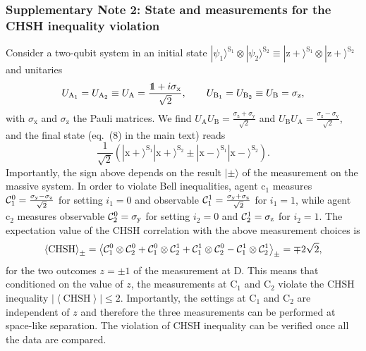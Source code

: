 \documentclass[a4paper,11pt]{article}
\newcommand\id{\leavevmode\hbox{\small1\kern-3.3pt\normalsize1}}
\newcommand{\ket}{\rangle}
\begin{document}
\subsubsection*{Supplementary Note 2: State and measurements for the CHSH inequality violation}

Consider a two-qubit system in an initial state $|\psi_1\ket^\mathrm{S_1}\otimes|\psi_2\ket^\mathrm{S_2}\equiv |\mathrm{z+}\ket^\mathrm{S_1}\otimes|\mathrm{z+}\ket^\mathrm{S_2}$ and unitaries %
\begin{equation}
\label{unitaries} U_\mathrm{A_1}=U_\mathrm{A_2}\equiv U_\mathrm{A} =\frac{\id + i\sigma_\mathrm{x}}{\sqrt{2}},\qquad  U_\mathrm{B_1}=U_\mathrm{B_2}\equiv U_\mathrm{B}= \sigma_\mathrm{z},
\end{equation}
with $\sigma_\mathrm{x}$ and $\sigma_\mathrm{z}$ the Pauli matrices. We find $U_\mathrm{A}U_\mathrm{B} = \frac{\sigma_\mathrm{z} + \sigma_\mathrm{y}}{\sqrt{2}}$ and $U_\mathrm{B}U_\mathrm{A} = \frac{\sigma_\mathrm{z} - \sigma_\mathrm{y}}{\sqrt{2}}$, and the final state (eq.~(8) in the main text) reads
%
\begin{equation}
\label{entangled2}
\frac{1}{\sqrt{2}}\left(|\mathrm{x+}\ket^\mathrm{S_1} |\mathrm{x+}\ket^\mathrm{S_2} \pm |\mathrm{x-}\ket^\mathrm{S_1}|\mathrm{x-}\ket^\mathrm{S_2}\right).
\end{equation}
%
Importantly,  the sign above depends on the result $|\pm\ket$ of the measurement on the massive system. In order to violate Bell inequalities, agent $\mathrm{c_1}$ measures ${\cal C}_1^0=\frac{\sigma_\mathrm{y}-\sigma_\mathrm{z}}{\sqrt{2}}$ for setting $i_1=0$ and observable ${\cal C}_1^1=\frac{\sigma_\mathrm{y}+\sigma_\mathrm{z}}{\sqrt{2}}$ for $i_1=1$, while agent $\mathrm c_2$ measures observable ${\cal C}_2^0=\sigma_\mathrm{y}$ for setting $i_2=0$ and ${\cal C}_2^1=\sigma_\mathrm{z}$ for $i_2=1$. The expectation value of the CHSH correlation \cite{Clauser1969} with the above measurement choices is
\begin{equation}
\left\langle \mathrm{CHSH} \right\rangle_{\pm} =
\left\langle {\cal C}_1^0\otimes {\cal C}_2^0 + {\cal C}_1^0\otimes {\cal C}_2^1 + {\cal C}_1^1\otimes {\cal C}_2^0 - {\cal C}_1^1\otimes {\cal C}_2^1 \right\rangle_{\pm} = \mp 2 \sqrt{2},
\label{CHSH}
\end{equation}
 for the two outcomes $z=\pm 1$ of the measurement at $\mathrm D$.
This means that conditioned on the value of $z$, the measurements at $\mathrm C_1$ and $\mathrm C_2$ violate the CHSH inequality $\left|\left\langle \mathrm{CHSH} \right\rangle\right| \leq 2$. Importantly,  the settings at $\mathrm C_1$ and $\mathrm C_2$ are independent of $z$ and therefore the three measurements can be performed at space-like separation. The violation of CHSH inequality can be verified once all the data are compared.
\end{document}
